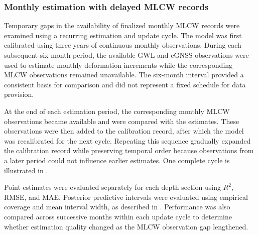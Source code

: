 \subsubsection{Monthly estimation with delayed MLCW records}
\label{subsec:delayed_evaluation}

Temporary gaps in the availability of finalized monthly MLCW records were examined using a recurring estimation and update cycle. The model was first calibrated using three years of continuous monthly observations. During each subsequent six-month period, the available GWL and cGNSS observations were used to estimate monthly deformation increments while the corresponding MLCW observations remained unavailable. The six-month interval provided a consistent basis for comparison and did not represent a fixed schedule for data provision.

At the end of each estimation period, the corresponding monthly MLCW observations became available and were compared with the estimates. These observations were then added to the calibration record, after which the model was recalibrated for the next cycle. Repeating this sequence gradually expanded the calibration record while preserving temporal order because observations from a later period could not influence earlier estimates. One complete cycle is illustrated in .

Point estimates were evaluated separately for each depth section using $R^2$, RMSE, and MAE. Posterior predictive intervals were evaluated using empirical coverage and mean interval width, as described in . Performance was also compared across successive months within each update cycle to determine whether estimation quality changed as the MLCW observation gap lengthened.

